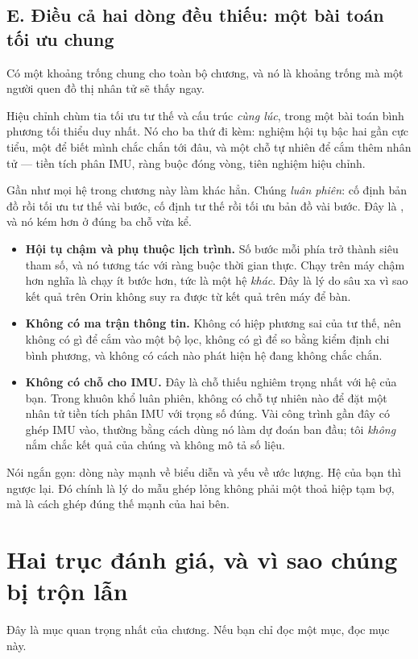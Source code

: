 \documentclass[../../deep_learning.tex]{subfiles}
\begin{document}
\subsection{E. Điều cả hai dòng đều thiếu: một bài toán tối ưu chung}
Có một khoảng trống chung cho toàn bộ chương, và nó là khoảng trống mà một người quen đồ thị nhân tử sẽ thấy ngay.

Hiệu chỉnh chùm tia tối ưu tư thế và cấu trúc \emph{cùng lúc}, trong một bài toán bình phương tối thiểu duy nhất. Nó cho ba thứ đi kèm: nghiệm hội tụ bậc hai gần cực tiểu, một  để biết mình chắc chắn tới đâu, và một chỗ tự nhiên để cắm thêm nhân tử --- tiền tích phân IMU, ràng buộc đóng vòng, tiên nghiệm hiệu chỉnh.

Gần như mọi hệ trong chương này làm khác hẳn. Chúng \emph{luân phiên}: cố định bản đồ rồi tối ưu tư thế vài bước, cố định tư thế rồi tối ưu bản đồ vài bước. Đây là , và nó kém hơn ở đúng ba chỗ vừa kể.

\begin{itemize}
\item \textbf{Hội tụ chậm và phụ thuộc lịch trình.} Số bước mỗi phía trở thành siêu tham số, và nó tương tác với ràng buộc thời gian thực. Chạy trên máy chậm hơn nghĩa là chạy ít bước hơn, tức là một hệ \emph{khác}. Đây là lý do sâu xa vì sao kết quả trên Orin không suy ra được từ kết quả trên máy để bàn.
\item \textbf{Không có ma trận thông tin.} Không có hiệp phương sai của tư thế, nên không có gì để cắm vào một bộ lọc, không có gì để so bằng kiểm định chi bình phương, và không có cách nào phát hiện hệ đang không chắc chắn.
\item \textbf{Không có chỗ cho IMU.} Đây là chỗ thiếu nghiêm trọng nhất với hệ của bạn. Trong khuôn khổ luân phiên, không có chỗ tự nhiên nào để đặt một nhân tử tiền tích phân IMU với trọng số đúng. Vài công trình gần đây có ghép IMU vào, thường bằng cách dùng nó làm dự đoán ban đầu; tôi \emph{không} nắm chắc kết quả của chúng và không mô tả số liệu.
\end{itemize}

Nói ngắn gọn: dòng này mạnh về biểu diễn và yếu về ước lượng. Hệ của bạn thì ngược lại. Đó chính là lý do mẫu ghép lỏng không phải một thoả hiệp tạm bợ, mà là cách ghép đúng thế mạnh của hai bên.

\section{Hai trục đánh giá, và vì sao chúng bị trộn lẫn}
\label{sec:f32-danhgia}
Đây là mục quan trọng nhất của chương. Nếu bạn chỉ đọc một mục, đọc mục này.
\end{document}
